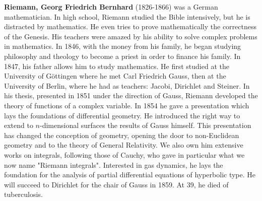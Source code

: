 \textbf{Riemann, Georg Friedrich Bernhard} (1826-1866) was a German mathematician. In high school, Riemann studied the Bible intensively, but he is distracted by mathematics. He even tries to prove mathematically the correctness of the Genesis. His teachers were amazed by his ability to solve complex problems in mathematics. In 1846, with the money from his family, he began studying philosophy and theology to become a priest in order to finance his family. In 1847, his father allows him to study mathematics. He first studied at the University of Göttingen where he met Carl Friedrich Gauss, then at the University of Berlin, where he had as teachers: Jacobi, Dirichlet and Steiner. In his thesis, presented in 1851 under the direction of Gauss, Riemann developed the theory of functions of a complex variable. In 1854 he gave a presentation which lays the foundations of differential geometry. He introduced the right way to extend to $n$-dimensional surfaces the results of Gauss himself. This presentation has changed the conception of geometry, opening the door to non-Euclidean geometry and to the theory of General Relativity. We also own him extensive works on integrals, following those of Cauchy, who gave in particular what we now name "Riemann integrals". Interested in gas dynamics, he lays the foundation for the analysis of partial differential equations of hyperbolic type. He will succeed to Dirichlet for the chair of Gauss in 1859. At 39, he died of tuberculosis.

{}

